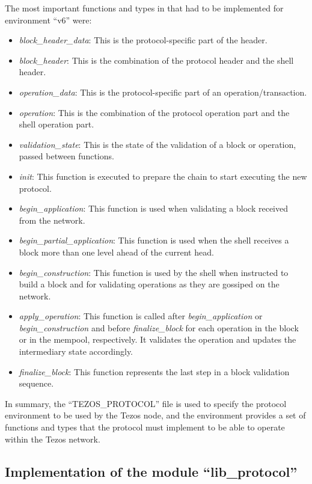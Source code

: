 The most important functions and types in that had to be implemented for environment ``v6'' were:

\begin{itemize}
    \item \emph{block\_header\_data}: This is the protocol-specific part of the header.
    \item \emph{block\_header}: This is the combination of the protocol header and the shell header.
    \item \emph{operation\_data}: This is the protocol-specific part of an operation/transaction.
    \item \emph{operation}: This is the combination of the protocol operation part and the shell operation part.
    \item \emph{validation\_state}: This is the state of the validation of a block or operation, passed between functions.
    \item \emph{init}: This function is executed to prepare the chain to start executing the new protocol.
    \item \emph{begin\_application}: This function is used when validating a block received from the network.
    \item \emph{begin\_partial\_application}: This function is used when the shell receives a block more than one level ahead of the current head. 
    \item \emph{begin\_construction}: This function is used by the shell when instructed to build a block and for validating operations as they are gossiped on the network.
    \item \emph{apply\_operation}: This function is called after \emph{begin\_application} or \emph{begin\_construction} and before \emph{finalize\_block} for each operation in the block or in the mempool, respectively. It validates the operation and updates the intermediary state accordingly.
    \item \emph{finalize\_block}: This function represents the last step in a block validation sequence.
\end{itemize}

In summary, the ``TEZOS\_PROTOCOL'' file is used to specify the protocol environment to be used by the Tezos node, and the environment provides a set of functions and types that the protocol must implement to be able to operate within the Tezos network.

\subsection*{Implementation of the module ``lib\_protocol''}

